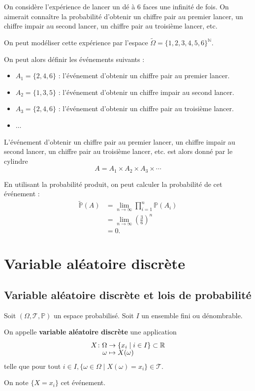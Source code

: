 \documentclass[a4paper,12pt]{article}
\begin{document}
\begin{exemple}
    On considère l'expérience de lancer un dé à 6 faces une infinité de fois. On aimerait connaître la probabilité d'obtenir un chiffre pair au premier lancer, un chiffre impair au second lancer, un chiffre pair au troisième lancer, etc.

    On peut modéliser cette expérience par l'espace $\tilde{\Omega} = \{1, 2, 3, 4, 5, 6\}^\mathbb{N}$.

    On peut alors définir les événements suivants :
    \begin{itemize}
        \item $A_1 = \{2, 4, 6\}$ : l'événement d'obtenir un chiffre pair au premier lancer.
        \item $A_2 = \{1, 3, 5\}$ : l'événement d'obtenir un chiffre impair au second lancer.
        \item $A_3 = \{2, 4, 6\}$ : l'événement d'obtenir un chiffre pair au troisième lancer.
        \item $\ldots$
    \end{itemize}
    L'événement d'obtenir un chiffre pair au premier lancer, un chiffre impair au second lancer, un chiffre pair au troisième lancer, etc. est alors donné par le cylindre
    $$
    A = A_1 \times A_2 \times A_3 \times \cdots
    $$

    En utilisant la probabilité produit, on peut calculer la probabilité de cet événement :
    \begin{align*}
    \tilde{\mathbb{P}}(A) &= \lim_{n \to \infty} \prod_{i=1}^n \mathbb{P}(A_i) \\
    &= \lim_{n \to \infty} \left( \frac{3}{6} \right)^n \\
    &= 0.
    \end{align*}
\end{exemple}

\section{Variable aléatoire discrète}

\subsection{Variable aléatoire discrète et lois de probabilité}

\begin{definition}
    Soit $(\Omega, \mathcal{T}, \mathbb{P})$ un espace probabilisé. Soit $I$ un ensemble fini ou dénombrable.

    On appelle \textbf{variable aléatoire discrète} une application
    $$
    \funcdef{X}{\Omega}{\{x_i \mid i \in I\} \subset \R}{\omega}{X(\omega)}
    $$ 
    telle que pour tout $i \in I, \{ \omega \in \Omega \mid X(\omega) = x_i \} \in \mathcal{T}$.

    On note $\{ X = x_i \}$ cet événement.
\end{definition}
\end{document}
